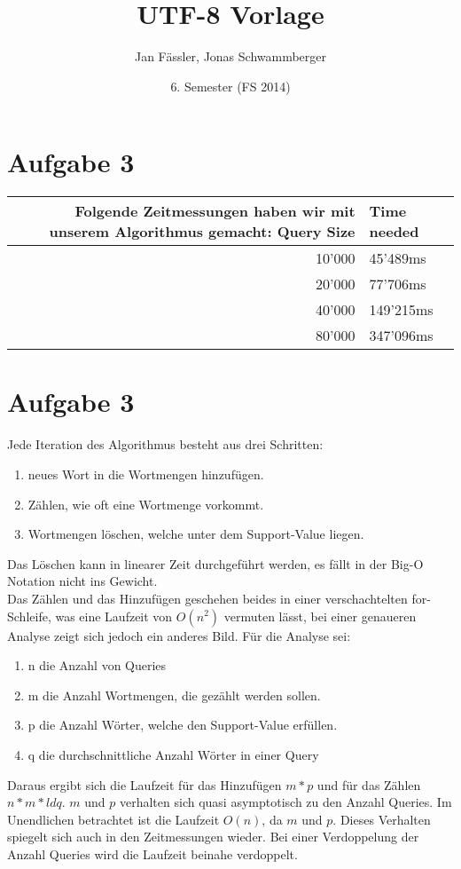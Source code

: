 \documentclass[10pt]{article}
\title{
	\vspace{5cm}
	UTF-8 Vorlage
}
\author{Jan Fässler, Jonas Schwammberger}
\date{6. Semester (FS 2014)}
\begin{document}
\setcounter{page}{1}


\section{Aufgabe 3}
\begin{tabular}{r|l}
Folgende Zeitmessungen haben wir mit unserem Algorithmus gemacht:
Query Size & Time needed \\\hline \hline
10'000 & 45'489ms\\\hline
20'000 & 77'706ms\\\hline
40'000 & 149'215ms\\\hline
80'000 & 347'096ms\\

\end{tabular}
\section{Aufgabe 3}
Jede Iteration des Algorithmus besteht aus drei Schritten:
\begin{enumerate}
	\item neues Wort in die Wortmengen hinzufügen.
	\item Zählen, wie oft eine Wortmenge vorkommt.
	\item Wortmengen löschen, welche unter dem Support-Value liegen.
\end{enumerate}

Das Löschen kann in linearer Zeit durchgeführt werden, es fällt in der Big-O Notation nicht ins Gewicht.\\
Das Zählen und das Hinzufügen geschehen beides in einer verschachtelten for-Schleife, was eine Laufzeit von $O(n^2)$ vermuten lässt, bei einer genaueren Analyse zeigt sich jedoch ein anderes Bild.
Für die Analyse sei:
\begin{enumerate}
	\item n die Anzahl von Queries
	\item m die Anzahl Wortmengen, die gezählt werden sollen.
	\item p die Anzahl Wörter, welche den Support-Value erfüllen.
	\item q die durchschnittliche Anzahl Wörter in einer Query
\end{enumerate}
Daraus ergibt sich die Laufzeit für das Hinzufügen $m*p$ und für das Zählen $n*m*ld q$. $m$ und $p$ verhalten sich quasi asymptotisch zu den Anzahl Queries. Im Unendlichen betrachtet ist die Laufzeit $O(n)$, da $m$ und $p$. Dieses Verhalten spiegelt sich auch in den Zeitmessungen wieder. Bei einer Verdoppelung der Anzahl Queries wird die Laufzeit beinahe verdoppelt. 


\end{document}

